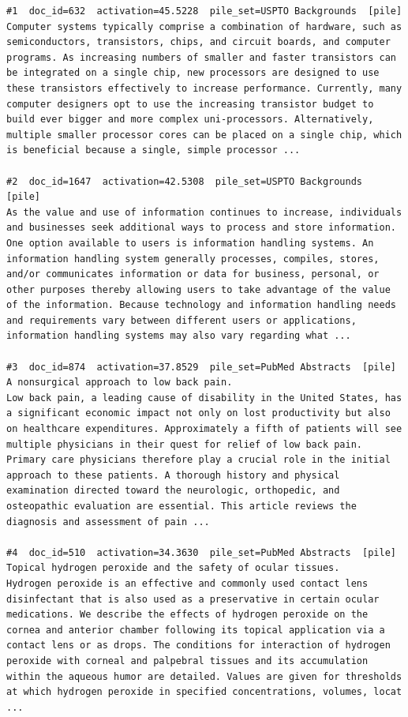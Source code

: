 \begin{verbatim}
#1  doc_id=632  activation=45.5228  pile_set=USPTO Backgrounds  [pile]
Computer systems typically comprise a combination of hardware, such as semiconductors, transistors, chips, and circuit boards, and computer programs. As increasing numbers of smaller and faster transistors can be integrated on a single chip, new processors are designed to use these transistors effectively to increase performance. Currently, many computer designers opt to use the increasing transistor budget to build ever bigger and more complex uni-processors. Alternatively, multiple smaller processor cores can be placed on a single chip, which is beneficial because a single, simple processor ...

#2  doc_id=1647  activation=42.5308  pile_set=USPTO Backgrounds  [pile]
As the value and use of information continues to increase, individuals and businesses seek additional ways to process and store information. One option available to users is information handling systems. An information handling system generally processes, compiles, stores, and/or communicates information or data for business, personal, or other purposes thereby allowing users to take advantage of the value of the information. Because technology and information handling needs and requirements vary between different users or applications, information handling systems may also vary regarding what ...

#3  doc_id=874  activation=37.8529  pile_set=PubMed Abstracts  [pile]
A nonsurgical approach to low back pain.
Low back pain, a leading cause of disability in the United States, has a significant economic impact not only on lost productivity but also on healthcare expenditures. Approximately a fifth of patients will see multiple physicians in their quest for relief of low back pain. Primary care physicians therefore play a crucial role in the initial approach to these patients. A thorough history and physical examination directed toward the neurologic, orthopedic, and osteopathic evaluation are essential. This article reviews the diagnosis and assessment of pain ...

#4  doc_id=510  activation=34.3630  pile_set=PubMed Abstracts  [pile]
Topical hydrogen peroxide and the safety of ocular tissues.
Hydrogen peroxide is an effective and commonly used contact lens disinfectant that is also used as a preservative in certain ocular medications. We describe the effects of hydrogen peroxide on the cornea and anterior chamber following its topical application via a contact lens or as drops. The conditions for interaction of hydrogen peroxide with corneal and palpebral tissues and its accumulation within the aqueous humor are detailed. Values are given for thresholds at which hydrogen peroxide in specified concentrations, volumes, locat ...


\end{verbatim}
